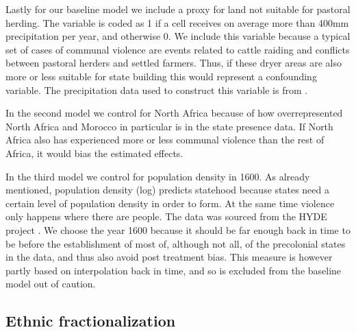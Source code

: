 Lastly for our baseline model we include a proxy for land not suitable for
pastoral herding. The variable is coded as 1 if a cell receives on average more
than 400mm precipitation per year, and otherwise 0. We include this variable
because a typical set of cases of communal violence are events related to cattle
raiding and conflicts between pastoral herders and settled farmers. Thus, if
these dryer areas are also more or less suitable for state building this would
represent a confounding variable. The precipitation data used to construct this
variable is from \citet{Schneider2015}.

In the second model we control for North Africa because of how overrepresented
North Africa and Morocco in particular is in the state presence data. If North
Africa also has experienced more or less communal violence than the rest of
Africa, it would bias the estimated effects.

In the third model we control for population density in 1600. As already
mentioned, population density (log) predicts statehood because states need a
certain level of population density in order to form. At the same time violence
only happens where there are people. The data was sourced from the HYDE project
\citep{Goldewijk2016}. We choose the year 1600 because it should be far enough
back in time to be before the establishment of most of, although not all, of the
precolonial states in the data, and thus also avoid post treatment bias. This
measure is however partly based on interpolation back in time, and so is
excluded from the baseline model out of caution. 

\subsection{Ethnic fractionalization} \label{Observable settlement patterns}

